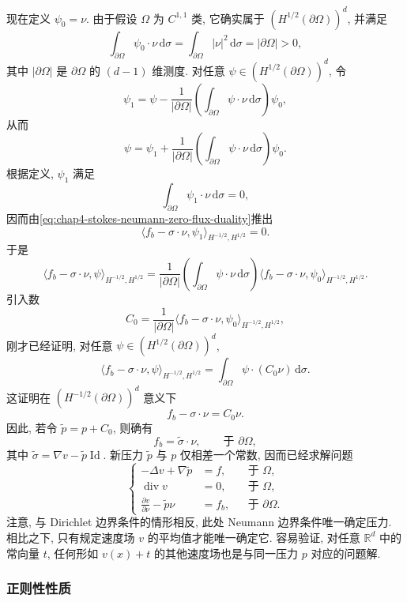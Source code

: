 \begin{Proof}
现在定义 $\psi_0=\nu$. 由于假设 $\Omega$ 为 $C^{1,1}$ 类, 它确实属于 $(H^{1/2}(\partial\Omega))^d$, 并满足
\[
 \int_{\partial\Omega}\psi_0\cdot\nu\,\mathrm d\sigma
 =\int_{\partial\Omega}|\nu|^2\,\mathrm d\sigma
 =|\partial\Omega|>0,
\]
其中 $|\partial\Omega|$ 是 $\partial\Omega$ 的 $(d-1)$ 维测度. 对任意 $\psi\in(H^{1/2}(\partial\Omega))^d$, 令
\[
 \psi_1=\psi-\frac1{|\partial\Omega|}
 \left(\int_{\partial\Omega}\psi\cdot\nu\,\mathrm d\sigma\right)\psi_0,
\]
从而
\[
 \psi=\psi_1+\frac1{|\partial\Omega|}
 \left(\int_{\partial\Omega}\psi\cdot\nu\,\mathrm d\sigma\right)\psi_0.
\]
根据定义, $\psi_1$ 满足
\[
 \int_{\partial\Omega}\psi_1\cdot\nu\,\mathrm d\sigma=0,
\]
因而由\eqref{eq:chap4-stokes-neumann-zero-flux-duality}推出
\[
 \langle f_b-\sigma\cdot\nu,\psi_1\rangle_{H^{-1/2},H^{1/2}}=0.
\]
于是
\[
 \langle f_b-\sigma\cdot\nu,\psi\rangle_{H^{-1/2},H^{1/2}}
 =\frac1{|\partial\Omega|}
 \left(\int_{\partial\Omega}\psi\cdot\nu\,\mathrm d\sigma\right)
 \langle f_b-\sigma\cdot\nu,\psi_0\rangle_{H^{-1/2},H^{1/2}}.
\]
引入数
\[
 C_0=\frac1{|\partial\Omega|}
 \langle f_b-\sigma\cdot\nu,\psi_0\rangle_{H^{-1/2},H^{1/2}},
\]
刚才已经证明, 对任意 $\psi\in(H^{1/2}(\partial\Omega))^d$,
\[
 \langle f_b-\sigma\cdot\nu,\psi\rangle_{H^{-1/2},H^{1/2}}
 =\int_{\partial\Omega}\psi\cdot(C_0\nu)\,\mathrm d\sigma.
\]
这证明在 $(H^{-1/2}(\partial\Omega))^d$ 意义下
\[
 f_b-\sigma\cdot\nu=C_0\nu.
\]
因此, 若令 $\widetilde p=p+C_0$, 则确有
\[
 f_b=\widetilde\sigma\cdot\nu,\qquad\text{于 }\partial\Omega,
\]
其中 $\widetilde\sigma=\nabla v-\widetilde p\operatorname{Id}$. 新压力 $\widetilde p$ 与 $p$ 仅相差一个常数, 因而已经求解问题
\[
 \left\{
 \begin{aligned}
  -\Delta v+\nabla\widetilde p&=f,&&\text{于 }\Omega,\\
  \operatorname{div}v&=0,&&\text{于 }\Omega,\\
  \frac{\partial v}{\partial\nu}-\widetilde p\nu&=f_b,&&\text{于 }\partial\Omega.
 \end{aligned}
 \right.
\]
注意, 与 Dirichlet 边界条件的情形相反, 此处 Neumann 边界条件唯一确定压力. 相比之下, 只有规定速度场 $v$ 的平均值才能唯一确定它. 容易验证, 对任意 $\mathbb R^d$ 中的常向量 $t$, 任何形如 $v(x)+t$ 的其他速度场也是与同一压力 $p$ 对应的问题解.
\end{Proof}

\subsubsection{正则性性质}
\label{subsec:chap4-stokes-neumann-regularity}

